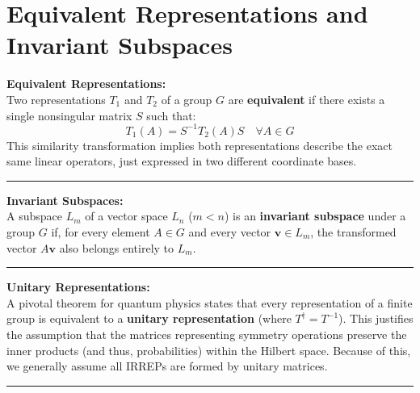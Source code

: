 \documentclass[11pt, a4paper]{report}
\begin{document}
\section{Equivalent Representations and Invariant Subspaces}

\textbf{Equivalent Representations:}\\
Two representations $T_1$ and $T_2$ of a group $G$ are \textbf{equivalent} if there exists a single nonsingular matrix $S$ such that:
\[ T_1(A) = S^{-1} T_2(A) S \quad \forall A \in G \]
This similarity transformation implies both representations describe the exact same linear operators, just expressed in two different coordinate bases.

\vspace{1em}
\hrule
\vspace{1em}

\textbf{Invariant Subspaces:}\\
A subspace $L_m$ of a vector space $L_n$ ($m < n$) is an \textbf{invariant subspace} under a group $G$ if, for every element $A \in G$ and every vector $\mathbf{v} \in L_m$, the transformed vector $A\mathbf{v}$ also belongs entirely to $L_m$.
\vspace{1em}
\hrule
\vspace{1em}

\textbf{Unitary Representations:}\\
A pivotal theorem for quantum physics states that every representation of a finite group is equivalent to a \textbf{unitary representation} (where $T^\dagger = T^{-1}$). This justifies the assumption that the matrices representing symmetry operations preserve the inner products (and thus, probabilities) within the Hilbert space. Because of this, we generally assume all IRREPs are formed by unitary matrices.
\vspace{1em}
\hrule
\vspace{1em}
\end{document}
